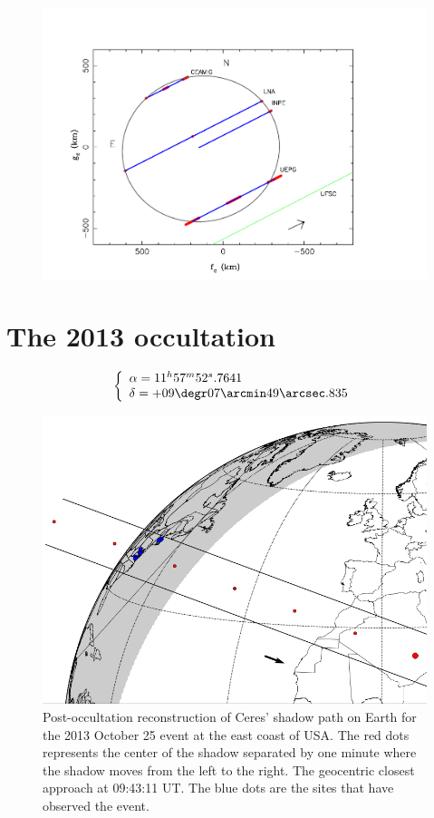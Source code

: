 \documentclass[useAMS,usenatbib]{mn2e}
\begin{document}
\begin{figure}
\includegraphics[scale=0.36]{figures/Ceres_2010_body.pdf} 
\caption{\label{Fig:Ceres-2010-body}}
\end{figure}

\section[]{The 2013 occultation}

\begin{equation}
\left\{ 
  \begin{array}{l l}
    \alpha = 11^{h}57^{m}52^{s}.7641\\
    \delta = +09\degr 07\arcmin 49\arcsec.835
  \end{array}
\right.
\end{equation}

\begin{figure}
\includegraphics[scale=0.42]{figures/Ceres_2013.png} 
\caption{Post-occultation reconstruction of Ceres' shadow path on Earth for the 2013 October 25 event at the east coast of USA. The red dots represents the center of the shadow separated by one minute where the shadow moves from the left to the right. The geocentric closest approach at 09:43:11 UT. The blue dots are the sites that have observed the event.\label{Fig: Ceres-2013-map}}
\end{figure}
\end{document}
